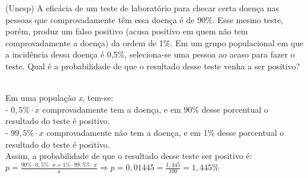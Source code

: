 \begin{ex}
(Unesp) A eficácia de um teste de laboratório para checar certa doença nas pessoas que comprovadamente têm essa doença é de 90\%. Esse mesmo teste, porém, produz um falso positivo (acusa positivo em quem não tem comprovadamente a doença) da ordem de 1\%. Em um grupo populacional em que a incidência dessa doença é 0,5\%, seleciona-se uma pessoa ao acaso para fazer o teste. Qual é a probabilidade de que o resultado desse teste venha a ser positivo?
  \begin{sol}
   \phantom{A} \\
   Em uma população \textit{x}, tem-se: \\
   - $0,5\%\cdot x$ comprovadamente tem a doença, e em 90\% desse porcentual o resultado do teste é positivo.\\
   - $99,5\% \cdot x$  comprovadamente não tem a doença, e em 1\% desse porcentual o resultado do teste é positivo.\\ Assim, a probabilidade de que o resultado desse teste ser positivo é: \\
   $p=\frac{90\%\cdot0,5\%\cdot x +1\% \cdot99,5\% \cdot x}{x} \Longrightarrow p= 0,01445=\frac{1,445}{100}=1,445\%$
   
   
  \end{sol}
\end{ex}